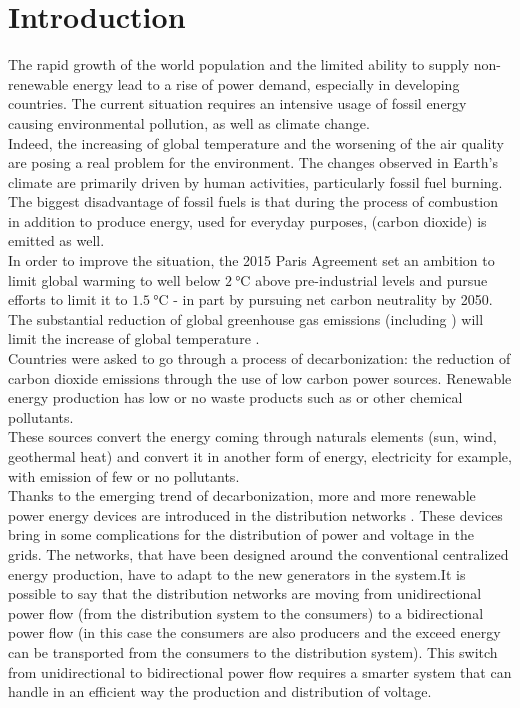 \chapter{Introduction}

%
The rapid growth of the world population and the limited ability to supply non-renewable energy lead to a rise of power demand, especially in developing countries. The current situation requires an intensive usage of fossil energy causing environmental pollution, as well as climate change. \\

Indeed, the increasing of global temperature and the worsening of the air quality are posing a real problem for the environment. The changes observed in Earth’s climate are primarily driven by human activities, particularly fossil fuel burning. The biggest disadvantage of fossil fuels is that during the process of combustion in addition to produce energy, used for everyday purposes,  (carbon dioxide) is emitted as well.\\

In order to improve the situation, the 2015 Paris Agreement set an ambition to limit global warming to well below $\SI{2}{\degreeCelsius}$ above pre-industrial levels and pursue efforts to limit it to $\SI{1.5}{\degreeCelsius}$ - in part by pursuing net carbon neutrality by 2050. The substantial reduction of global greenhouse gas emissions (including )  will limit the increase of global temperature \cite{french_conference}. \\
Countries were asked to go through a process of decarbonization: the reduction of carbon dioxide emissions through the use of low carbon power sources. Renewable energy production has low or no waste products such as  or other chemical pollutants.  \\
These sources convert the energy coming through naturals elements (sun, wind, geothermal heat) and convert it in another form of energy, electricity for example, with emission of few or no pollutants.\\

Thanks to the emerging trend of decarbonization, more and more renewable power energy devices are introduced in the distribution networks \cite{owidenergy}. These devices bring in some complications for the distribution of power and voltage in the grids. The networks, that have been designed around the conventional centralized energy production, have to adapt to the new generators in the system.It is possible to say that the distribution networks are moving from unidirectional power flow (from the distribution system to the consumers) to a bidirectional power flow (in this case the consumers are also producers and the exceed energy can be transported from the consumers to the distribution system). This switch from unidirectional to bidirectional power flow requires a smarter system that can handle in an efficient way the production and distribution of voltage.\\

